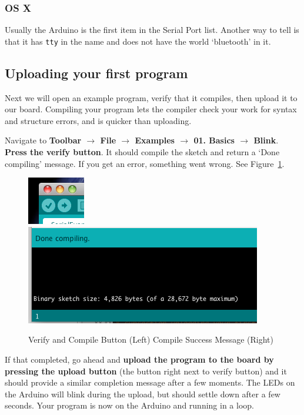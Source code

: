 \documentclass[11pt,a4paper]{article}
\begin{document}
\subsubsection{OS X} %
\label{ssub:os_x}
Usually the Arduino is the first item in the Serial Port list.  Another way to tell is that it has \texttt{tty} in the name and does not have the world `bluetooth' in it.



\subsection{Uploading your first program} %
\label{sub:uploading_your_first_program}
Next we will open an example program, verify that it compiles, then upload it to our board.  Compiling your program lets the compiler check your work for syntax and structure errors, and is quicker than uploading.

Navigate to \textbf{Toolbar $\rightarrow$ File $\rightarrow$ Examples $\rightarrow$ 01. Basics $\rightarrow$ Blink}.  \textbf{Press the verify button}.  It should compile the sketch and return a `Done compiling' message.  If you get an error, something went wrong. See Figure~\ref{fig:figures_verify}. 

    \begin{figure}[htbp]
        \centering
            \includegraphics{figures/verify.png}\includegraphics{figures/compile.png}
        \caption{Verify and Compile Button (Left) Compile Success Message (Right)}
        \label{fig:figures_verify}
    \end{figure}

If that completed, go ahead and \textbf{upload the program to the board by pressing the upload button} (the button right next to verify button) and it should provide a similar completion message after a few moments.  The LEDs on the Arduino will blink during the upload, but should settle down after a few seconds.  Your program is now on the Arduino and running in a loop.
    
\end{document}
